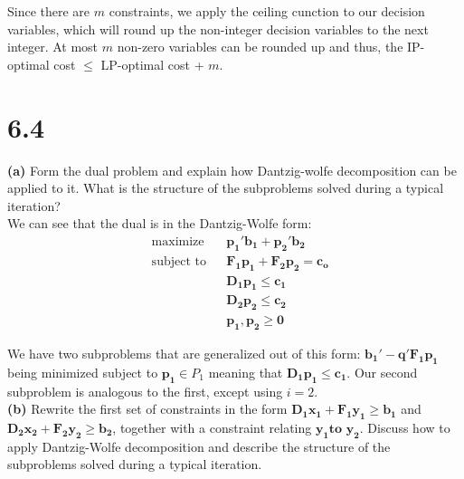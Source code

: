 \documentclass{article}
\begin{document}
\noindent
Since there are $m$ constraints, we apply the ceiling cunction to our decision variables, which will round up the non-integer decision variables to the next integer.  At most $m$ non-zero variables can be rounded up and thus, the IP-optimal cost $\leq$ LP-optimal cost + $m$. \\

\section*{6.4}

\noindent
\textbf{(a)}
Form the dual problem and explain how Dantzig-wolfe decomposition can be applied to it.  What is the structure of the subproblems solved during a typical iteration? \\

\noindent
We can see that the dual is in the Dantzig-Wolfe form:
\begin{equation*}
\begin{aligned}
& \text{maximize} && \mathbf{p_1' b_1 + p_2' b_2} \\
& \text{subject to} &&  \mathbf{F_1 p_1 + F_2 p_2 = c_o} \\
& & & \mathbf{D_1 p_1 \leq c_1} \\
& & & \mathbf{D_2 p_2 \leq c_2} \\
& & & \mathbf{p_1, p_2 \geq 0}
\end{aligned}
\end{equation*}

\noindent
We have two subproblems that are generalized out of this form: $\mathbf{b_1' - q'F_1 p_1}$ being minimized subject to $\mathbf{p_1} \in P_1$ meaning that $\mathbf{D_1 p_1 \leq c_1}$.  Our second subproblem is analogous to the first, except using $i = 2$. \\

\noindent
\textbf{(b)} Rewrite the first set of constraints in the form $\mathbf{D_1 x_1 + F_1 y_1 \geq b_1}$ and $\mathbf{D_2 x_2 + F_2 y_2 \geq b_2}$, together with a constraint relating $\mathbf{y_1 \text{to } y_2}$.  Discuss how to apply Dantzig-Wolfe decomposition and describe the structure of the subproblems solved during a typical iteration. \\
\end{document}
